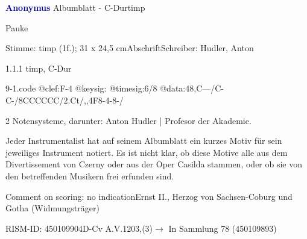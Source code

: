 \documentclass[a4paper, twocolumn, 11pt]{book}
\begin{document}
\par \vspace{16pt} \textcolor{darkblue}{\textbf{Anonymus  }}\hfillplus{[9]}\newline Albumblatt - C-Dur\newline timp
\par \begin{itshape}[heading:] Pauke\end{itshape} 
\par \textcolor{darkblue}{}  Stimme: timp  (1f.); 31 x 24,5 cm\newline Abschrift\newline Schreiber: Hudler, Anton
\par 1.1.1  timp, C-Dur  
\begin{filecontents*}{9-1.code}
@clef:F-4
@keysig:
@timesig:6/8
@data:48,C---/C-C-/{8CCC}{CCC}/2.Ct/,,4F8-4-8-/
\end{filecontents*}
\newline %
\par 2 Notensysteme, darunter: Anton Hudler | Profesor der Akademie.
\par Jeder Instrumentalist hat auf seinem Albumblatt ein kurzes Motiv für sein jeweiliges Instrument notiert. Es ist nicht klar, ob diese Motive alle aus dem {\textquotedbl}Divertissement{\textquotedbl} von Czerny oder aus der Oper {\textquotedbl}Casilda{\textquotedbl} stammen, oder ob sie von den betreffenden Musikern frei erfunden sind.
\par Comment on scoring: no indication\newline Ernst II., Herzog von Sachsen-Coburg und Gotha  (Widmungsträger)
\par RISM-ID: 450109904\newline D-Cv  A.V.1203,(3)\newline $\rightarrow$ In Sammlung 78 (450109893)
      
\end{document}
